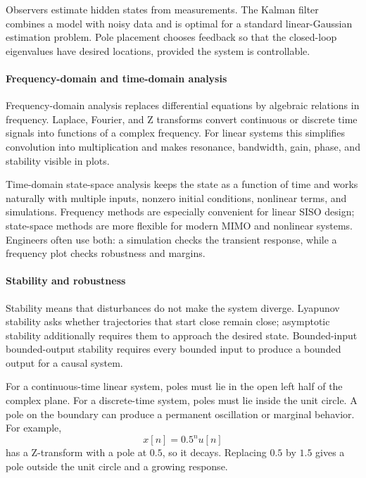 Observers estimate hidden states from measurements. The Kalman filter combines a model with noisy data and is optimal for a standard linear-Gaussian estimation problem. Pole placement chooses feedback so that the closed-loop eigenvalues have desired locations, provided the system is controllable. \cite{control_theory_ref7,control_theory_ref8}

\paragraph{Frequency-domain and time-domain analysis}

Frequency-domain analysis replaces differential equations by algebraic relations in frequency. Laplace, Fourier, and Z transforms convert continuous or discrete time signals into functions of a complex frequency. For linear systems this simplifies convolution into multiplication and makes resonance, bandwidth, gain, phase, and stability visible in plots.

Time-domain state-space analysis keeps the state as a function of time and works naturally with multiple inputs, nonzero initial conditions, nonlinear terms, and simulations. Frequency methods are especially convenient for linear SISO design; state-space methods are more flexible for modern MIMO and nonlinear systems. Engineers often use both: a simulation checks the transient response, while a frequency plot checks robustness and margins.

\paragraph{Stability and robustness}

Stability means that disturbances do not make the system diverge. Lyapunov stability asks whether trajectories that start close remain close; asymptotic stability additionally requires them to approach the desired state. Bounded-input bounded-output stability requires every bounded input to produce a bounded output for a causal system.

For a continuous-time linear system, poles must lie in the open left half of the complex plane. For a discrete-time system, poles must lie inside the unit circle. A pole on the boundary can produce a permanent oscillation or marginal behavior. For example,
\[
 x[n]=0.5^n u[n]
\]
has a Z-transform with a pole at $0.5$, so it decays. Replacing $0.5$ by $1.5$ gives a pole outside the unit circle and a growing response.

